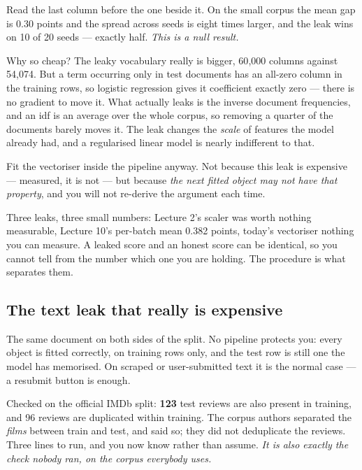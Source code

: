 \documentclass[11pt,a4paper]{article}
\begin{document}
Read the last column before the one beside it. On the small corpus the mean gap
is 0.30 points and the spread across seeds is eight times larger, and the leak
wins on 10 of 20 seeds --- exactly half. \emph{This is a null result.}

Why so cheap? The leaky vocabulary really is bigger, 60{,}000 columns against
54{,}074. But a term occurring only in test documents has an all-zero column in
the training rows, so logistic regression gives it coefficient exactly zero ---
there is no gradient to move it. What actually leaks is the inverse document
frequencies, and an idf is an average over the whole corpus, so removing a
quarter of the documents barely moves it. The leak changes the \emph{scale} of
features the model already had, and a regularised linear model is nearly
indifferent to that.

\begin{keybox}[title={And the decision rule is not about the size}]
Fit the vectoriser inside the pipeline anyway. Not because this leak is
expensive --- measured, it is not --- but because \emph{the next fitted object
may not have that property}, and you will not re-derive the argument each time.

Three leaks, three small numbers: Lecture 2's scaler was worth nothing
measurable, Lecture 10's per-batch mean 0.382 points, today's vectoriser
nothing you can measure. A leaked score and an honest score can be identical,
so you cannot tell from the number which one you are holding. The procedure is
what separates them.
\end{keybox}

\subsection{The text leak that really is expensive}

The same document on both sides of the split. No pipeline protects you: every
object is fitted correctly, on training rows only, and the test row is still
one the model has memorised. On scraped or user-submitted text it is the normal
case --- a resubmit button is enough.

Checked on the official IMDb split: \textbf{123} test reviews are also present
in training, and 96 reviews are duplicated within training. The corpus authors
separated the \emph{films} between train and test, and said so; they did not
deduplicate the reviews. Three lines to run, and you now know rather than
assume. \emph{It is also exactly the check nobody ran, on the corpus everybody
uses.}
\end{document}
